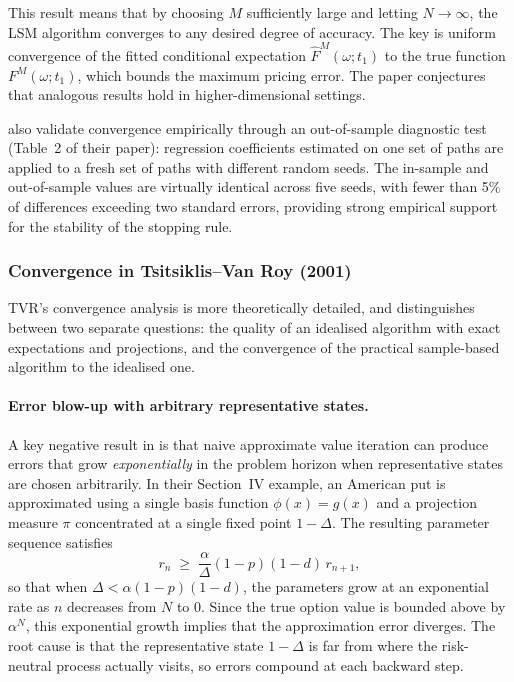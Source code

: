 This result means that by choosing $M$ sufficiently large and letting
$N \to \infty$, the LSM algorithm converges to any desired degree of
accuracy. The key is uniform convergence of the fitted conditional
expectation $\hat{F}^M(\omega; t_1)$ to the true function $F^M(\omega;
t_1)$, which bounds the maximum pricing error. The paper conjectures that
analogous results hold in higher-dimensional settings.

\citet{longstaff2001} also validate convergence empirically through an
out-of-sample diagnostic test (Table~2 of their paper): regression
coefficients estimated on one set of paths are applied to a fresh set of
paths with different random seeds. The in-sample and out-of-sample values
are virtually identical across five seeds, with fewer than 5\% of
differences exceeding two standard errors, providing strong empirical
support for the stability of the stopping rule.

\subsubsection{Convergence in Tsitsiklis--Van Roy (2001)}

TVR's convergence analysis is more theoretically detailed, and
distinguishes between two separate questions: the quality of an idealised
algorithm with exact expectations and projections, and the convergence of
the practical sample-based algorithm to the idealised one.

\paragraph{Error blow-up with arbitrary representative states.}
A key negative result in \citet{tsitsiklis2001} is that naive approximate
value iteration can produce errors that grow \emph{exponentially} in the
problem horizon when representative states are chosen arbitrarily. In their
Section~IV example, an American put is approximated using a single basis
function $\phi(x) = g(x)$ and a projection measure $\pi$ concentrated at
a single fixed point $1 - \Delta$. The resulting parameter sequence
satisfies
\begin{equation}
    r_n \;\geq\; \frac{\alpha}{\Delta}(1-p)(1-d)\, r_{n+1},
    \label{eq:TVR_blowup}
\end{equation}
so that when $\Delta < \alpha(1-p)(1-d)$, the parameters grow at an
exponential rate as $n$ decreases from $N$ to $0$. Since the true option
value is bounded above by $\alpha^N$, this exponential growth implies that
the approximation error diverges. The root cause is that the representative
state $1-\Delta$ is far from where the risk-neutral process actually
visits, so errors compound at each backward step.

